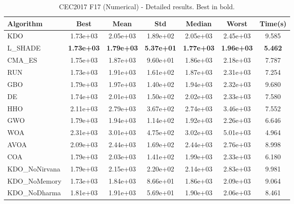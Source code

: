 \begin{table}[H]
\centering\small
\caption{CEC2017 F17 (Numerical) - Detailed results. Best in bold.}
\label{tab:cec2017_F17}
\begin{tabular}{lcccccc}
\toprule
\textbf{Algorithm} & \textbf{Best} & \textbf{Mean} & \textbf{Std} & \textbf{Median} & \textbf{Worst} & \textbf{Time(s)} \\
\midrule
KDO & 1.73e+03 & 2.05e+03 & 1.89e+02 & 2.05e+03 & 2.45e+03 & 9.585 \\
L_SHADE & \textbf{1.73e+03} & \textbf{1.79e+03} & \textbf{5.37e+01} & \textbf{1.77e+03} & \textbf{1.96e+03} & \textbf{5.462} \\
CMA_ES & 1.75e+03 & 1.87e+03 & 9.60e+01 & 1.86e+03 & 2.18e+03 & 7.787 \\
RUN & 1.73e+03 & 1.91e+03 & 1.61e+02 & 1.87e+03 & 2.31e+03 & 7.254 \\
GBO & 1.79e+03 & 1.97e+03 & 1.40e+02 & 1.94e+03 & 2.32e+03 & 9.680 \\
DE & 1.74e+03 & 2.01e+03 & 1.50e+02 & 2.02e+03 & 2.33e+03 & 7.580 \\
HHO & 2.11e+03 & 2.79e+03 & 3.67e+02 & 2.74e+03 & 3.46e+03 & 7.552 \\
GWO & 1.79e+03 & 1.94e+03 & 1.14e+02 & 1.92e+03 & 2.26e+03 & 6.646 \\
WOA & 2.31e+03 & 3.01e+03 & 4.75e+02 & 3.02e+03 & 5.01e+03 & 4.964 \\
AVOA & 2.09e+03 & 2.44e+03 & 1.69e+02 & 2.44e+03 & 2.76e+03 & 8.998 \\
COA & 1.79e+03 & 2.03e+03 & 1.41e+02 & 1.99e+03 & 2.33e+03 & 6.180 \\
KDO_NoNirvana & 1.79e+03 & 2.15e+03 & 2.20e+02 & 2.14e+03 & 2.83e+03 & 9.981 \\
KDO_NoMemory & 1.73e+03 & 1.84e+03 & 8.66e+01 & 1.86e+03 & 2.09e+03 & 9.064 \\
KDO_NoDharma & 1.81e+03 & 1.91e+03 & 5.69e+01 & 1.90e+03 & 2.06e+03 & 8.461 \\
\bottomrule
\end{tabular}
\end{table}
